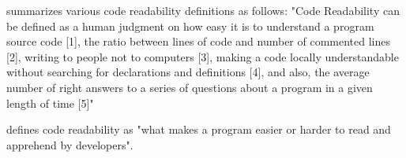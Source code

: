 \documentclass[%
class=scrreprt,
chapterprefix=false,%
open=right,%
twoside=false,%
paper=a4,%
logofile={Logo\_zentral\_farbig\_EN.png},%
thesistype=master,%
UKenglish,%
]{se2thesis}
\begin{document}
	\citeauthor{tashtoush2013impact} summarizes various code readability definitions as follows:
	"Code Readability can be defined as a human judgment on how easy it is to understand a
	program source code [1], the ratio between lines of code and number of commented lines [2],
	writing to people not to computers [3], making a code locally understandable without
	searching for declarations and definitions [4], and also, the average number of right answers
	to a series of questions about a program in a given length of time [5]"
	
	\citeauthor{oliveira2020evaluating} defines code readability as "what makes a program easier or harder to read and apprehend by developers".
	




	
\end{document}
